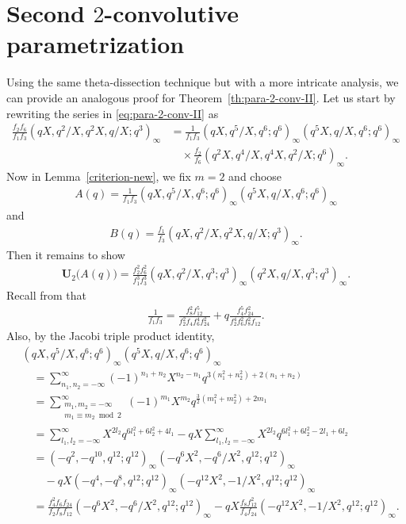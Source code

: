 \documentclass[12pt,reqno]{amsart}
\numberwithin{equation}{section}
\theoremstyle{plain}
\theoremstyle{definition}
\theoremstyle{named}
\newcommand{\UU}{\mathbf{U}}
\begin{document}
\section{Second $2$-convolutive parametrization}\label{sec:para-2-II}

Using the same theta-dissection technique but with a more intricate analysis, we can provide an analogous proof for Theorem~\ref{th:para-2-conv-II}. Let us start by rewriting the series in \eqref{eq:para-2-conv-II} as
\begin{align*}
	\frac{f_2 f_6}{f_1 f_3} (qX,q^2/X,q^2X,q/X;q^3)_\infty &= \frac{1}{f_1f_3} (qX,q^5/X,q^6;q^6)_\infty(q^5X,q/X,q^6;q^6)_\infty\\
	&\quad\times \frac{f_2}{f_6} (q^2X,q^4/X,q^4X,q^2/X;q^6)_\infty.
\end{align*}
Now in Lemma~\ref{criterion-new}, we fix $m=2$ and choose
\begin{align*}
	A(q) = \frac{1}{f_1f_3} (qX,q^5/X,q^6;q^6)_\infty(q^5X,q/X,q^6;q^6)_\infty
\end{align*}
and
\begin{align*}
	B(q) = \frac{f_1}{f_3} (qX,q^2/X,q^2X,q/X;q^3)_\infty.
\end{align*}
Then it remains to show
\begin{align*}
	\UU_2\big(A(q)\big) = \frac{f_2^2 f_6^2}{f_1^3 f_3^3} (qX,q^2/X,q^3;q^3)_\infty (q^2X,q/X,q^3;q^3)_\infty.
\end{align*}
Recall from \cite[p.~218, eq.~(25.1.7)]{Hir} that
\begin{align*}
	\frac{1}{f_1f_3}=\frac{f_8^2f_{12}^5}{f_2^2f_4f_6^4f_{24}^2}+q\frac{f_4^5f_{24}^2}{f_2^4f_6^2f_8^2f_{12}}.
\end{align*}
Also, by the Jacobi triple product identity,
\begin{align*}
	&(qX,q^5/X,q^6;q^6)_\infty (q^5X,q/X,q^6;q^6)_\infty\\
	&\quad = \sum_{n_1,n_2=-\infty}^\infty (-1)^{n_1+n_2} X^{n_2-n_1} q^{3(n_1^2+n_2^2)+2(n_1+n_2)}\\
	&\quad = \sum_{\substack{m_1,m_2=-\infty\\m_1\equiv m_2 \bmod{2}}}^\infty (-1)^{m_1} X^{m_2} q^{\frac{3}{2}(m_1^2+m_2^2)+2m_1}\\
	&\quad = \sum_{l_1,l_2=-\infty}^\infty X^{2l_2} q^{6l_1^2+6l_2^2+4l_1} - qX \sum_{l_1,l_2=-\infty}^\infty X^{2l_2} q^{6l_1^2+6l_2^2-2l_1+6l_2}\\
	&\quad = (-q^2,-q^{10},q^{12};q^{12})_\infty (-q^6X^2,-q^6/X^2,q^{12};q^{12})_\infty\\
	&\quad\quad - qX (-q^4,-q^8,q^{12};q^{12})_\infty (-q^{12}X^2,-1/X^2,q^{12};q^{12})_\infty\\
	&\quad = \frac{f_4^2f_6f_{24}}{f_2f_8f_{12}}(-q^6X^2,-q^6/X^2,q^{12};q^{12})_\infty - qX \frac{f_8 f_{12}^2}{f_4 f_{24}}(-q^{12}X^2,-1/X^2,q^{12};q^{12})_\infty.
\end{align*}
\end{document}
